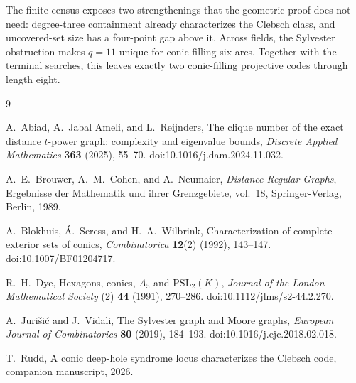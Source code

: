 \documentclass[11pt]{article}
\theoremstyle{remark}
\begin{document}
The finite census exposes two strengthenings that the geometric proof does
not need: degree-three containment already characterizes the Clebsch class,
and uncovered-set size has a four-point gap above it.  Across fields, the
Sylvester obstruction makes $q=11$ unique for conic-filling six-arcs.
Together with the terminal searches, this leaves exactly two
conic-filling projective codes through length eight.

\begin{thebibliography}{9}

A.~Abiad, A.~Jabal Ameli, and L.~Reijnders,
\newblock The clique number of the exact distance $t$-power graph:
complexity and eigenvalue bounds,
\newblock \emph{Discrete Applied Mathematics} \textbf{363} (2025), 55--70.
\newblock doi:10.1016/j.dam.2024.11.032.

A.~E.~Brouwer, A.~M.~Cohen, and A.~Neumaier,
\newblock \emph{Distance-Regular Graphs},
\newblock Ergebnisse der Mathematik und ihrer Grenzgebiete, vol.~18,
Springer-Verlag, Berlin, 1989.

A.~Blokhuis, Á.~Seress, and H.~A.~Wilbrink,
\newblock Characterization of complete exterior sets of conics,
\newblock \emph{Combinatorica} \textbf{12}(2) (1992), 143--147.
\newblock doi:10.1007/BF01204717.

R.~H.~Dye,
\newblock Hexagons, conics, $A_5$ and $\mathrm{PSL}_2(K)$,
\newblock \emph{Journal of the London Mathematical Society} (2) \textbf{44}
(1991), 270--286.
\newblock doi:10.1112/jlms/s2-44.2.270.

A.~Juri\v{s}i\'c and J.~Vidali,
\newblock The Sylvester graph and Moore graphs,
\newblock \emph{European Journal of Combinatorics} \textbf{80} (2019),
184--193.
\newblock doi:10.1016/j.ejc.2018.02.018.

T.~Rudd,
\newblock A conic deep-hole syndrome locus characterizes the Clebsch code,
\newblock companion manuscript, 2026.

\end{thebibliography}
\end{document}
